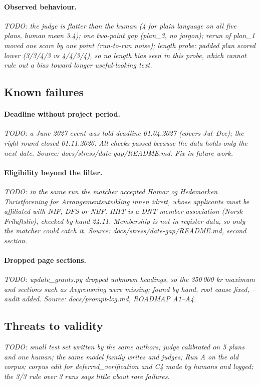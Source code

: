 \paragraph{Observed behaviour.}
\textit{TODO: the judge is flatter than the human (4 for plain language on all five plans, human mean 3.4); one
two-point gap (plan\_3, no jargon); rerun of plan\_1 moved one score by one point (run-to-run noise); length probe:
padded plan scored lower (3/3/4/3 vs 4/4/3/4), so no length bias seen in this probe, which cannot rule out a bias toward
longer useful-looking text.}

\subsection{Known failures}
\paragraph{Deadline without project period.}
\textit{TODO: a June 2027 event was told deadline 01.04.2027 (covers Jul--Dec); the right round closed 01.11.2026. All
checks passed because the data holds only the next date. Source: docs/stress/date-gap/README.md. Fix in future work.}
\paragraph{Eligibility beyond the filter.}
\textit{TODO: in the same run the matcher accepted Hamar og Hedemarken Turistforening for Arrangementsutvikling
innen idrett, whose applicants must be affiliated with NIF, DFS or NBF. HHT is a DNT member association (Norsk Friluftsliv),
checked by hand 24.11. Membership is not in register data, so only the matcher could catch it. Source:
docs/stress/date-gap/README.md, second section.}
\paragraph{Dropped page sections.}
\textit{TODO: update\_grants.py dropped unknown headings, so the 350\,000 kr maximum and sections such as Avgrensning were
missing; found by hand, root cause fixed, --audit added. Source: docs/prompt-log.md, ROADMAP A1--A4.}

\subsection{Threats to validity}
\textit{TODO: small test set written by the same authors; judge calibrated on 5 plans and one human; the same model family
writes and judges; Run A on the old corpus; corpus edit for deferred\_verification and C4 made by humans and logged; the
3/3 rule over 3 runs says little about rare failures.}
